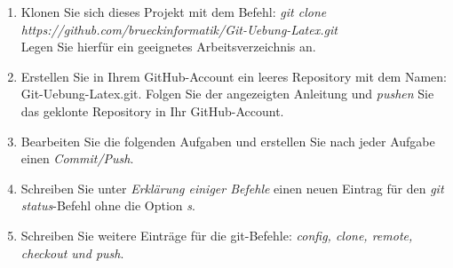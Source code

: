 \documentclass[11pt]{article}
\begin{document}
\begin{enumerate}
  
\item Klonen Sie sich dieses Projekt mit dem Befehl: \linebreak \textsl{git clone https://github.com/brueckinformatik/Git-Uebung-Latex.git}\\
Legen Sie hierfür ein geeignetes Arbeitsverzeichnis an.
\item Erstellen Sie in Ihrem GitHub-Account ein leeres Repository mit dem Namen: Git-Uebung-Latex.git. Folgen Sie der angezeigten Anleitung und \textsl{pushen} Sie das geklonte Repository in Ihr GitHub-Account.
\item Bearbeiten Sie die folgenden Aufgaben und erstellen Sie nach jeder Aufgabe einen \textsl{Commit/Push}.
\item Schreiben Sie unter \textsl{Erklärung einiger Befehle} einen neuen Eintrag für den \textsl{git status}-Befehl ohne die Option \textsl{s}.
\item Schreiben Sie weitere Einträge für die git-Befehle: \textsl{config, clone, remote, checkout und push}.
\end{enumerate}
\end{document}

